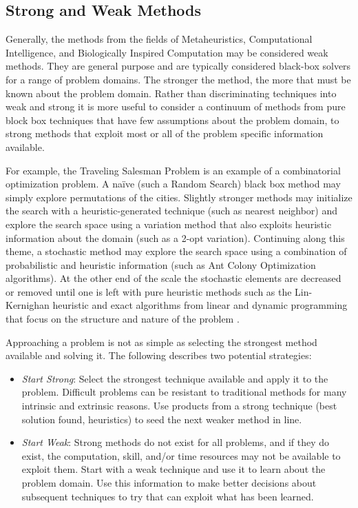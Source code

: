 %
%
\subsection{Strong and Weak Methods}
\label{sec:strong_methods}
Generally, the methods from the fields of Metaheuristics, Computational Intelligence, and Biologically Inspired Computation may be considered weak methods. They are general purpose and are typically considered black-box solvers for a range of problem domains. The stronger the method, the more that must be known about the problem domain.
Rather than discriminating techniques into weak and strong it is more useful to consider a continuum of methods from pure block box techniques that have few assumptions about the problem domain, to strong methods that exploit most or all of the problem specific information available.

For example, the Traveling Salesman Problem is an example of a combinatorial optimization problem. A na\"ive (such a Random Search) black box method may simply explore permutations of the cities. Slightly stronger methods may initialize the search with a heuristic-generated technique (such as nearest neighbor) and explore the search space using a variation method that also exploits heuristic information about the domain (such as a 2-opt variation). Continuing along this theme, a stochastic method may explore the search space using a combination of probabilistic and heuristic information (such as Ant Colony Optimization algorithms). At the other end of the scale the stochastic elements are decreased or removed until one is left with pure heuristic methods such as  the Lin-Kernighan heuristic \cite{Lin1973} and exact algorithms from linear and dynamic programming that focus on the structure and nature of the problem \cite{Woeginger2003}.

Approaching a problem is not as simple as selecting the strongest method available and solving it. The following describes two potential strategies:

\begin{itemize}
  \item \emph{Start Strong}: Select the strongest technique available and apply it to the problem. Difficult problems can be resistant to traditional methods for many intrinsic and extrinsic reasons. Use products from a strong technique (best solution found, heuristics) to seed the next weaker method in line. 
  \item \emph{Start Weak}: Strong methods do not exist for all problems, and if they do exist, the computation, skill, and/or time resources may not be available to exploit them. Start with a weak technique and use it to learn about the problem domain. Use this information to make better decisions about subsequent techniques to try that can exploit what has been learned.
\end{itemize}

